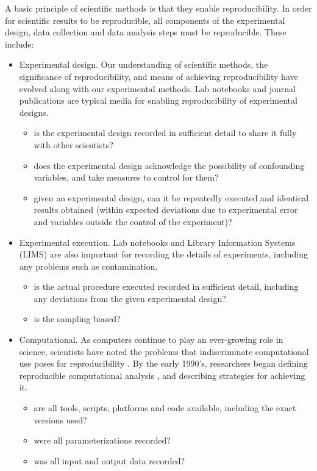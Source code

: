 A basic principle of scientific methods is that they enable reproducibility.  
In order for scientific results to be reproducible, all components of the 
experimental design, data collection and data analysis steps must be 
reproducible.  These include:
\begin{itemize}

  \item Experimental design.  Our understanding of scientific methods, the 
  significance of reproducibility, and means of achieving reproducibility 
  have evolved along with our experimental methods.  Lab notebooks and journal 
  publications are typical media for enabling reproducibility of experimental 
  designs.  
  \begin{itemize}
     \item is the experimental design recorded in sufficient detail to share 
       it fully with other scientists?
     \item does the experimental design acknowledge the possibility of 
       confounding variables, and take measures to control for them?
     \item given an experimental design, can it be repeatedly executed and 
       identical results obtained (within expected deviations due to experimental 
       error and variables outside the control of the experiment)?
       \cite{drummond2012reproducible}
  \end{itemize}

  \item Experimental execution.  Lab notebooks and Library Information Systems 
  (LIMS) are also important for recording the details of experiments, including 
  any problems such as contamination.
  \begin{itemize}
     \item is the actual procedure executed recorded in sufficient detail, 
     including any deviations from the given experimental design?
     \item is the sampling biased? \cite{savovic2012influence, simmons2011false}
  \end{itemize}

  \item Computational.  As computers continue to play an ever-growing role in 
  science, scientists have noted the problems that indiscriminate computational 
  use poses for reproducibility \cite{donoho2009, peng2011reproducible}.  
  By the early 1990's, researchers began defining reproducible 
  computational analysis \cite{donoho_wavelab}, and 
  describing strategies for achieving it. 
  \begin{itemize}
     \item are all tools, scripts, platforms and code available, including the 
       exact versions used? 
       \cite{ince2012open, nekrutenko2012next, blankenberg2014dissemination}
     \item were all parameterizations recorded? \cite{landis2012call}
     \item was all input and output data recorded?
  \end{itemize}


\end{itemize}
